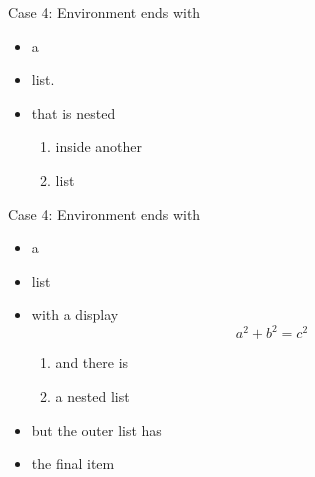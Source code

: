 \documentclass[leqno]{article}
\begin{document}
\begin{remark}
  Case 4: Environment ends with
  \begin{itemize}
  \item a
  \item list.
  \item that is nested
    \begin{enumerate}
    \item inside another
    \item list
    \end{enumerate}
  \end{itemize}
\end{remark}

\begin{note}
  Case 4: Environment ends with
  \begin{itemize}
  \item a
  \item list
  \item with a display
    \[
      a^2 + b^2 = c^2
    \]
    \begin{enumerate}
    \item and there is
    \item a nested list
    \end{enumerate}
  \item but the outer list has
  \item the final item 
  \end{itemize}
\end{note}
\end{document}
